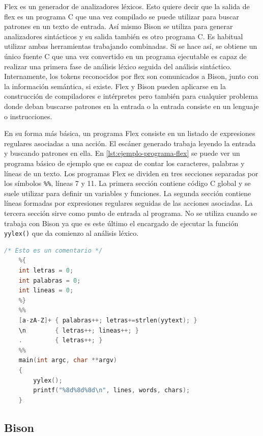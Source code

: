 Flex es un generador de analizadores léxicos. Esto quiere decir que la salida de flex es un programa C que una vez compilado se puede utilizar para buscar patrones en un texto de entrada. Así mismo Bison se utiliza para generar analizadores sintácticos y su salida también es otro programa C. Es habitual utilizar ambas herramientas trabajando combinadas. Si se hace así, se obtiene un único fuente C que una vez convertido en un programa ejecutable es capaz de realizar una primera fase de análisis léxico seguida del análisis sintáctico. Internamente, los tokens reconocidos por flex son comunicados a Bison, junto con la información semántica, si existe. Flex y Bison pueden aplicarse en la construcción de compiladores e intérpretes pero también para cualquier problema donde deban buscarse patrones en la entrada o la entrada consiste en un lenguaje o instrucciones.

En su forma más básica, un programa Flex consiste en un listado de expresiones regulares asociadas a una acción. El escáner generado trabaja leyendo la entrada y buscando patrones en ella. En \ref{lst:ejemplo-programa-flex} se puede ver un programa básico de ejemplo que es capaz de contar los caracteres, palabras y líneas de un texto. Los programas Flex se dividen en tres secciones separadas por los símbolos \verb|%%|, líneas 7 y 11. La primera sección contiene código C global y se suele utilizar para definir un variables y funciones. La segunda sección contiene líneas formadas por expresiones regulares seguidas de las acciones asociadas. La tercera sección sirve como punto de entrada al programa. No se utiliza cuando se trabaja con Bison ya que es este último el encargado de ejecutar la función \verb|yylex()| que da comienzo al análisis léxico.

\begin{lstlisting}[language=C,caption={Ejemplo de programa Flex autónomo},label=lst:ejemplo-programa-flex]
    /* Esto es un comentario */
    %{
    int letras = 0;
    int palabras = 0;
    int lineas = 0;
    %}
    %%
    [a-zA-Z]+ { palabras++; letras+=strlen(yytext); }
    \n        { letras++; lineas++; }
    .         { letras++; }
    %%
    main(int argc, char **argv)
    {
        yylex();
        printf("%8d%8d%8d\n", lines, words, chars);
    }
\end{lstlisting}

\subsection{Bison}


